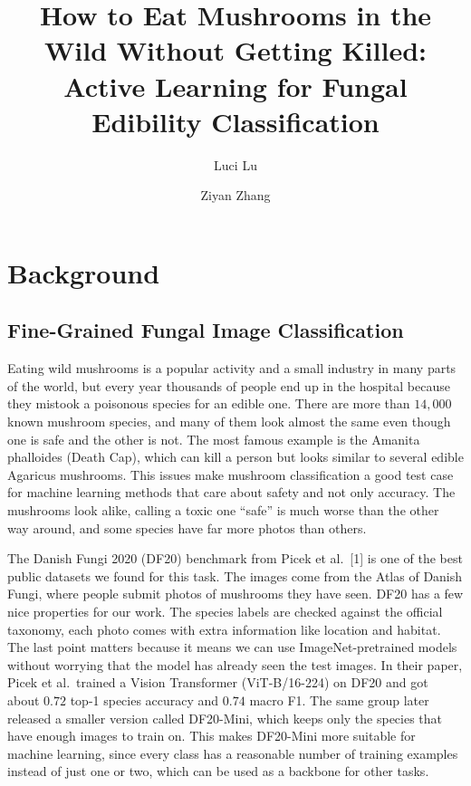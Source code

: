 \documentclass[11pt]{article}
\title{\vspace{-2em}\textbf{How to Eat Mushrooms in the Wild Without Getting Killed:\\
Active Learning for Fungal Edibility Classification}}
\author{Luci Lu \and Ziyan Zhang}
\date{}
\begin{document}
\maketitle
\thispagestyle{plain}

\section{Background}

\subsection{Fine-Grained Fungal Image Classification}

Eating wild mushrooms is a popular activity and a small industry in many parts
of the world, but every year thousands of people end up in the hospital
because they mistook a poisonous species for an edible one. There are more
than $14{,}000$ known mushroom species, and many of them look almost the same even though one is safe and the other is not. The most famous example is the
Amanita phalloides (Death Cap), which can kill a person but looks
similar to several edible Agaricus mushrooms. This issues make mushroom classification a good test case for machine
learning methods that care about safety and not only accuracy. The mushrooms
look alike, calling a toxic one ``safe'' is much worse than the other way
around, and some species have far more photos than others.

The Danish Fungi 2020 (DF20) benchmark from Picek et al.~[1] is one of the
best public datasets we found for this task. The images come from the Atlas
of Danish Fungi, where people submit photos of mushrooms they have seen.
DF20 has a few nice properties for our work. The species labels are checked
against the official taxonomy, each photo comes with extra information like
location and habitat. The last
point matters because it means we can use ImageNet-pretrained models without
worrying that the model has already seen the test images. In their paper,
Picek et al.\ trained a Vision Transformer (ViT-B/16-224) on DF20 and got
about $0.72$ top-1 species accuracy and $0.74$ macro F1. The same group later released a smaller version called DF20-Mini, which
keeps only the species that have enough images to train on. This makes
DF20-Mini more suitable for machine learning, since every class has a
reasonable number of training examples instead of just one or two, which can be used as a backbone for other tasks.
\end{document}
